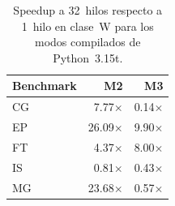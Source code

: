 \begin{table}[htbp]
\centering
\small
\begin{tabular}{lrr}
\hline
Benchmark & M2 & M3 \\
\hline
CG & 7.77$\times$ & 0.14$\times$ \\
EP & 26.09$\times$ & 9.90$\times$ \\
FT & 4.37$\times$ & 8.00$\times$ \\
IS & 0.81$\times$ & 0.43$\times$ \\
MG & 23.68$\times$ & 0.57$\times$ \\
\hline
\end{tabular}
\caption{Speedup a 32~hilos respecto a 1~hilo en clase~W para los modos compilados de Python~3.15t.}
\label{tab:resultados-w-speedup32-modos}
\end{table}
